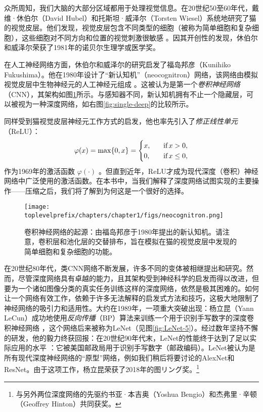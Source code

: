 \documentclass[../../book-main_zh.tex]{subfiles}
\begin{document}
众所周知，我们大脑的大部分区域都用于处理视觉信息。在20世纪50至60年代，戴维·休伯尔（David Hubel）和托斯坦·威泽尔（Torsten Wiesel）系统地研究了猫的视觉皮层。他们发现，视觉皮层包含不同类型的细胞（被称为简单细胞和复杂细胞），这些细胞对不同方向和位置的视觉刺激很敏感 \cite{Hubel-Wiesel-1959}。因其开创性的发现，休伯尔和威泽尔荣获了1981年的诺贝尔生理学或医学奖。


在人工神经网络方面，休伯尔和威泽尔的研究启发了福岛邦彦（Kunihiko Fukushima）。他在1980年设计了“新认知机”（neocognitron）网络，该网络由模拟视觉皮层中生物神经元的人工神经元组成 \cite{Fukushima1980NeocognitronAS}。这被认为是第一个{\em 卷积神经网络}（CNN），其架构如图\ref{fig:neocognitron}所示。与感知器不同，新认知机拥有不止一个隐藏层，可以被视为一种深度网络，如右图\ref{fig:single-deep}的比较所示。

同样受到猫视觉皮层神经元工作方式的启发，他也率先引入了{\em 修正线性单元}（ReLU）：
\begin{equation}
    \varphi(x) = \max\{0, x\} = \begin{cases}x, & \text{if} \, x > 0, \\ 0, \quad & \text{if} \, x \leq 0,\end{cases}
\end{equation}
作为1969年的激活函数 $\varphi(\cdot)$ \cite{Fukushima-1969}。但直到近年，ReLU才成为现代深度（卷积）神经网络中广泛使用的激活函数。在本书中，当我们解释了深度网络试图实现的主要操作——压缩之后，我们将了解到为何这是一个很好的选择。

\begin{figure}
    \centering
    \texttt{[image: \\toplevelprefix/chapters/chapter1/figs/neocognitron.png]}
    \caption{卷积神经网络的起源：由福岛邦彦于1980年提出的新认知机。请注意，卷积层和池化层的交替排布，旨在模拟在猫的视觉皮层中发现的简单细胞和复杂细胞的功能。}
    \label{fig:neocognitron}
\end{figure}

在20世纪80年代，类CNN网络不断发展，许多不同的变体被相继提出和研究。然而，尽管深度网络具有卓越的能力，且其架构受到神经科学的启发而得以改进，但要为一个诸如图像分类的真实任务训练这样的深度网络，依然是极其困难的。如何让一个网络有效工作，依赖于许多无法解释的启发式方法和技巧，这极大地限制了神经网络的吸引力和适用性。大约在1989年，一项重大突破出现：杨立昆（Yann LeCun）成功地使用{\em 反向传播}（BP）算法来训练一个用于识别手写数字的深度卷积神经网络 \cite{LeCun-1989}，这个网络后来被称为LeNet（见图\ref{fig:LeNet-5}）。经过数年坚持不懈的研发，他的毅力终获回报：在20世纪90年代末，LeNet的性能终于达到了足以实际应用的水平 \cite{LeCun-1998}：它被美国邮政局用于识别手写数字（邮政编码）。LeNet被认为是所有现代深度神经网络的“原型”网络，例如我们稍后将要讨论的AlexNet和ResNet。由于这项工作，杨立昆荣获了2018年的图リング奖。\footnote{与另外两位深度网络的先驱约书亚·本吉奥（Yoshua Bengio）和杰弗里·辛顿（Geoffrey Hinton）共同获奖。}
\end{document}
